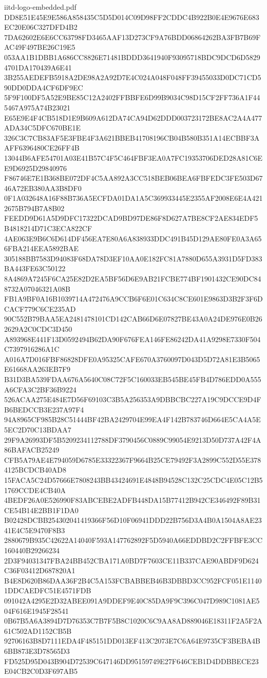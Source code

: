 \begin{filecontents*}[overwrite]{iitd-logo-embedded.pdf}
DD8E51E45E9E586A858435C5D5D014C09D98FF2CDDC4B922B0E4E9676E683EC20E06C327DFD4B2
7DA62602E6E6CC63798FD3465AAF13D273CF9A76BDD06864262BA3FB7B69FAC49F497BE26C19E5
053AA1B1DBB1A686CC8826E71481BDDD3641940F93095718BDC9DCD6D58294701DA170439A6E41
3B255AEDEFB5918A2DE98A2A92D7E4C024A048F048FF39455033D0DC71CD590DD0DDA4CF6DF9EC
5F9F100DF5A52E9BE85C12A2402FFBBFE6D99B9034C98D15CF2FF736A1F445467A975A74B23021
E65E9E4F4CB518D1E9B609A612DA74CA94D62DDD003723172BE8AC2A4A477ADA34C5DFC670BE1E
326C3C7CB83AF5E3FBE4F3A621BBEB41708196CB04B580B351A14ECBBF3AAFF6396480CE26FF4B
13044B6AFE54701A03E41B57C4F5C464FBF3EA0A7FC19353706DED28A81C6EE9D6925D29840976
F86746E7E1B368BE072DF4C5AA892A3CC518BEB06BEA6FBFEDC3FE503D6746A72EB380AA3B8DF0
0F1A032648A16F88B736A5ECFDA01DA1A5C369933445E2355AF2008E6E4A4212675B794B7A8B02
FEEDD9D61A5D9DFC17322DCAD9BD97DE86F8D627A7BE8CF2AE834EDF5B4818214D71C3ECA822CF
4AE063E9B6C6D614DF456EA7E80A6A838933DDC491B45D129AE80FE0A3A656FBA214EEA5892BAE
305188BB7583D94083F68DA78D3EF10AA0E182FC81A7880D655A3931D5FD383BA443FE63C50122
8A4869A7245F6CA25E82D2EA5BF56D6E9AB21FCBE774BF1901432CE90DC848732A07046321A08B
FB1A9BF0A16B1039714A472476A9CCB6F6E01C634C8CE601E9863D3B2F3F6DCACF779C6CE235AD
90C552B79BAA5EA2481478101CD142CAB66D6E07827BE43A0A24DE976E0B262629A2C0CDC3D450
A893968E441F13D0592494B62DA90F676FEA146FE86242DA41A9298E7330F504C7397916286A1C
A016A7D016FBF86828DFE0A95325CAFE670A3760097D043D5D72A81E3B5065E61668AA263EB7F9
B31D3BA539FDAA676A5640C08C72F5C160033EB545BE45FB4D786EDD0A555A6CFA3C2BF36B9224
526ACAA275E484E7D56F69103C3B5A256353A9DBBCBC227A19C9DCCE9D4FB6BEDCCB3E237A97F4
94A8965CF985B28C51444BF42BA2429704E99EA4F142B783746D664E5CA4A5E5EC2D70C13BDAA7
29F9A26993DF5B5209234112788DF3790456C0889C99054E9213D50D737A42F4A86BAFACB25249
CFB5A79AE4E794059D6785E33322367F9664B25CE79492F3A2899C552D55E3784125BCDCB40AD8
15FACA5C24D57666E7808243BB43424691E4848B94528C132C25CDC4E05C12B51769CCDE4CB40A
4BEDF26A0E526990F83ABCEBE2ADFB448DA15B77412B942CE346492F89B31CE54B14E2BB1F1DA0
B02428DCBB254302041419366F56D10F06941DDD22B756D3A4B0A1504A8AE2341E4C5E9470F8B3
2880679B935C42622A14040F593A147762892F5D5940A66EDDBD2C2FFBFE3CC160440B29266234
2D3F94031347FBA24BB452CBA171A0BD7F7603CE11B337CAE90ABDF9D624C36F03412D687820A1
B4E8D620B86DAA36F2B4C5A153FCBABBEB46B3DBBD3CC952FCF051E11401DDCAEDFC51E4571FDB
091042A4295E2D32ABEE091A9DDEF9E40C85DA9F9C396C047D989C1081AE504F616E1945F28541
0B67B5A6A3894D7D76353C7B7F5B8C1020C6C9AA8AD889046E18311F2A5F2A61C502AD1152CB5B
92706163B8D7111EDA4F485151DD013EF413C2073E7C6A64E9735CF3BEBA4B6BB873E3D78565D3
FD525D95D043B904D72539C647146DD95159749E27F646CEB1D4DDBBECE23E04CB2C0D3F697AB5

\end{filecontents*}
